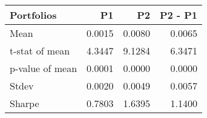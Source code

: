 \begin{tabular}{lrrr}
\toprule
Portfolios & P1 & P2 & P2 - P1 \\
\midrule
Mean & 0.0015 & 0.0080 & 0.0065 \\
t-stat of mean & 4.3447 & 9.1284 & 6.3471 \\
p-value of mean & 0.0001 & 0.0000 & 0.0000 \\
Stdev & 0.0020 & 0.0049 & 0.0057 \\
Sharpe & 0.7803 & 1.6395 & 1.1400 \\
\bottomrule
\end{tabular}
